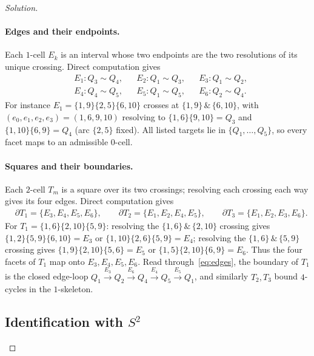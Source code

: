 \documentclass{amsart}
\theoremstyle{definition}
\newcommand{\bdy}{\partial}
\begin{document}
\begin{proof}[Solution]
\paragraph{Edges and their endpoints.}
Each $1$-cell $E_k$ is an interval whose two endpoints are the two resolutions of its unique
crossing. Direct computation gives
\begin{equation}\label{eq:edges}
\begin{aligned}
&E_1: Q_3\!\sim\!Q_4, && E_2: Q_1\!\sim\!Q_3, && E_3: Q_1\!\sim\!Q_2,\\
&E_4: Q_4\!\sim\!Q_5, && E_5: Q_1\!\sim\!Q_5, && E_6: Q_2\!\sim\!Q_4.
\end{aligned}
\end{equation}
For instance $E_1=\{1,9\}\{2,5\}\{6,10\}$ crosses at $\{1,9\}\,\&\,\{6,10\}$, with
$(e_0,e_1,e_2,e_3)=(1,6,9,10)$ resolving to $\{1,6\}\{9,10\}=Q_3$ and $\{1,10\}\{6,9\}=Q_4$
(arc $\{2,5\}$ fixed). All listed targets lie in $\{Q_1,\dots,Q_5\}$, so every facet maps to
an admissible $0$-cell.

\paragraph{Squares and their boundaries.}
Each $2$-cell $T_m$ is a square over its two crossings; resolving each crossing each way gives
its four edges. Direct computation gives
\begin{equation}\label{eq:faces}
\begin{aligned}
&\bdy T_1 = \{E_3,E_4,E_5,E_6\},\qquad
 \bdy T_2 = \{E_1,E_2,E_4,E_5\},\qquad
 \bdy T_3 = \{E_1,E_2,E_3,E_6\}.
\end{aligned}
\end{equation}
For $T_1=\{1,6\}\{2,10\}\{5,9\}$: resolving the $\{1,6\}\,\&\,\{2,10\}$ crossing gives
$\{1,2\}\{5,9\}\{6,10\}=E_3$ or $\{1,10\}\{2,6\}\{5,9\}=E_4$; resolving the
$\{1,6\}\,\&\,\{5,9\}$ crossing gives $\{1,9\}\{2,10\}\{5,6\}=E_5$ or
$\{1,5\}\{2,10\}\{6,9\}=E_6$. Thus the four facets of $T_1$ map onto $E_3,E_4,E_5,E_6$. Read
through~\eqref{eq:edges}, the boundary of $T_1$ is the closed edge-loop
$Q_1\xrightarrow{E_3}Q_2\xrightarrow{E_6}Q_4\xrightarrow{E_4}Q_5\xrightarrow{E_5}Q_1$, and
similarly $T_2,T_3$ bound $4$-cycles in the $1$-skeleton.

\subsection{Identification with \texorpdfstring{$S^2$}{S2}}\label{sec:sphere}


\end{proof}
\end{document}
